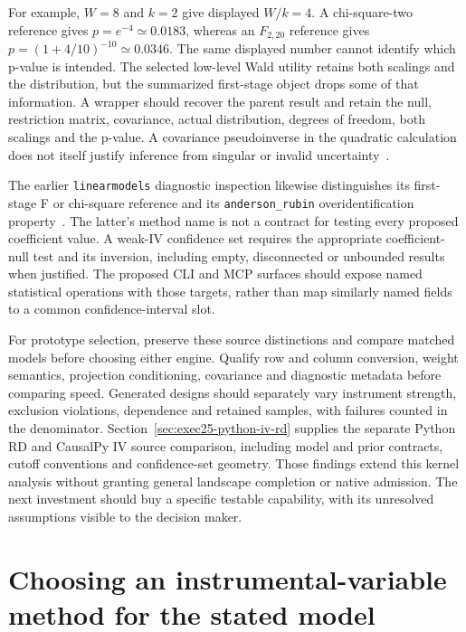 For example, $W=8$ and $k=2$ give displayed $W/k=4$. A chi-square-two reference
gives $p=e^{-4}\simeq0.0183$, whereas an $F_{2,20}$ reference gives
$p=(1+4/10)^{-10}\simeq0.0346$. The same displayed number cannot identify
which p-value is intended. The selected low-level Wald utility retains both
scalings and the distribution, but the summarized first-stage object drops
some of that information. A wrapper should recover the parent result and
retain the null, restriction matrix, covariance, actual distribution, degrees
of freedom, both scalings and the p-value. A covariance pseudoinverse in the
quadratic calculation does not itself justify inference from singular or
invalid uncertainty~\citep{exec22_pyiv_kernels_pyfixest,exec22_pyiv_reference}.

The earlier \texttt{linearmodels} diagnostic inspection likewise distinguishes
its first-stage F or chi-square reference and its \texttt{anderson\_rubin}
overidentification property~\citep{exec22_pyiv_diagnostics_linearmodels}.
The latter's method name is not a contract for
testing every proposed coefficient value. A weak-IV confidence set requires
the appropriate coefficient-null test and its inversion, including empty,
disconnected or unbounded results when justified. The proposed CLI and MCP
surfaces should expose named statistical operations with those targets, rather
than map similarly named fields to a common confidence-interval slot.

For prototype selection, preserve these source distinctions and compare
matched models before choosing either engine. Qualify row and column conversion,
weight semantics, projection conditioning, covariance and diagnostic metadata
before comparing speed. Generated designs should separately vary instrument
strength, exclusion violations, dependence and retained samples, with failures
counted in the denominator. Section~\ref{sec:exec25-python-iv-rd} supplies the
separate Python RD and CausalPy IV source comparison, including model and prior
contracts, cutoff conventions and confidence-set geometry. Those findings
extend this kernel analysis without granting general landscape completion or
native admission. The next investment should buy a
specific testable capability, with its unresolved assumptions visible to the
decision maker.


\section{Choosing an instrumental-variable method for the stated model}
\label{exec23:iv-choice}

